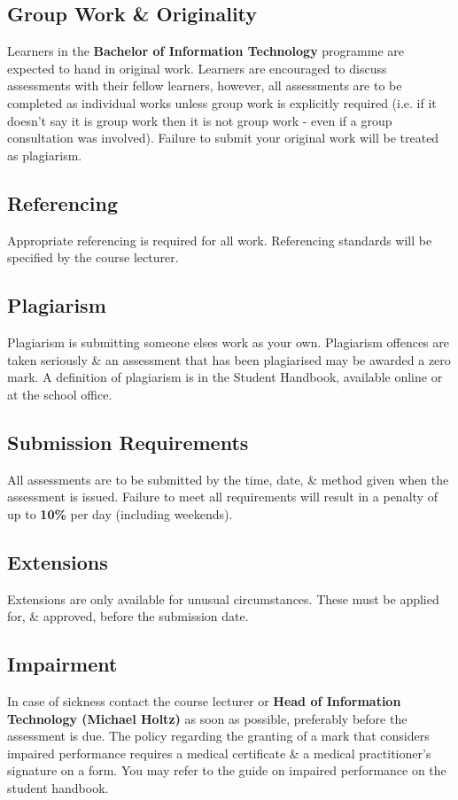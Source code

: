 \documentclass{article}
\begin{document}
\subsection*{Group Work \& Originality}
Learners in the \textbf{Bachelor of Information Technology} programme are expected to hand in original work. Learners are encouraged to discuss assessments with their fellow learners, however, all assessments are to be completed as individual works unless group work is explicitly required (i.e. if it doesn't say it is group work then it is not group work - even if a group consultation was involved). Failure to submit your original work will be treated as plagiarism.

\subsection*{Referencing}
Appropriate referencing is required for all work. Referencing standards will be specified by the course lecturer.

\subsection*{Plagiarism}
Plagiarism is submitting someone elses work as your own. Plagiarism offences are taken seriously \& an assessment that has been plagiarised may be awarded a zero mark. A definition of plagiarism is in the Student Handbook, available online or at the school office.

\subsection*{Submission Requirements}
All assessments are to be submitted by the time, date, \& method given when the assessment is issued. Failure to meet all requirements will result in a penalty of up to \textbf{10\%} per day (including weekends).

\subsection*{Extensions}
Extensions are only available for unusual circumstances. These must be applied for, \& approved, before the submission date.

\subsection*{Impairment}
In case of sickness contact the course lecturer or \textbf{Head of Information Technology (Michael Holtz)} as soon as possible, preferably before the assessment is due. The policy regarding the granting of a mark that considers impaired performance requires a medical certificate \& a medical practitioner's signature on a form. You may refer to the guide on impaired performance on the student handbook.
\end{document}

